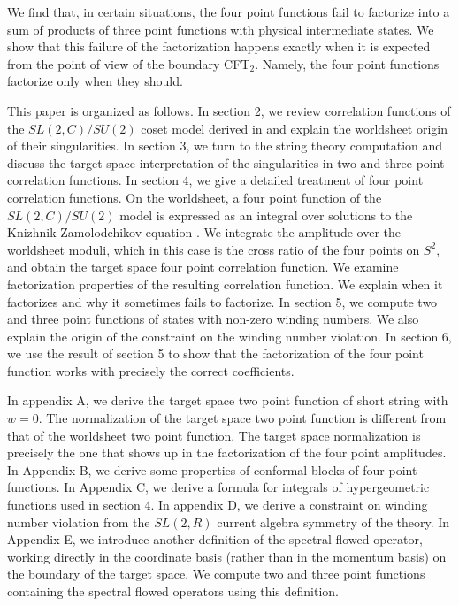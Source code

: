 We find that, in certain situations, the four point
functions fail to factorize into a sum of products of
three point functions with physical intermediate states.
We show that this failure of the factorization happens
exactly when it is expected from the point
of view of the boundary CFT$_2$. Namely, the four point
functions factorize only when they should.

This paper is organized as follows. In section 2, we
review correlation functions of the $SL(2,C)/SU(2)$
coset model derived in  and explain
the worldsheet origin of their singularities.
In section 3,
we turn to the string theory computation and discuss the
target space interpretation  of the singularities
in two and three point correlation functions.
In section 4, we give a detailed treatment of four
point correlation functions. On the worldsheet,
a four point function of the $SL(2,C)/SU(2)$ model
is expressed as an integral over solutions to the
Knizhnik-Zamolodchikov equation \teschnersecond . We integrate
the amplitude over the worldsheet moduli, which in
this case is the cross ratio of the four points on $S^2$, and
obtain the target space four point correlation function.
We examine factorization properties of the resulting
correlation function. We explain when it factorizes and why it
sometimes fails to factorize.
In section 5, we compute two and three point
functions of states with non-zero winding numbers.
We also explain the origin of the constraint on the
winding number violation.
In section 6, we use the result of section 5 to show that
the factorization of the four point function works
with precisely the correct coefficients.

In appendix A, we derive the target space two point function
of short string with $w=0$. The normalization of the target space
two point function is different from that of the worldsheet
two point function. The target space normalization is precisely
the one that shows up in the factorization of the four point
amplitudes. In Appendix B, we derive some properties
of conformal blocks of four point functions.
In Appendix C, we derive a formula for integrals of
hypergeometric functions used in section 4.
In appendix D,  we derive a  constraint on winding number violation
from the $SL(2,R)$ current algebra symmetry of the theory.
In Appendix E, we introduce another definition of the spectral
flowed operator, working directly in the coordinate basis (rather
than in the momentum basis) on the
boundary of the target space. We compute
two and three point functions containing the spectral flowed
operators using this definition.

